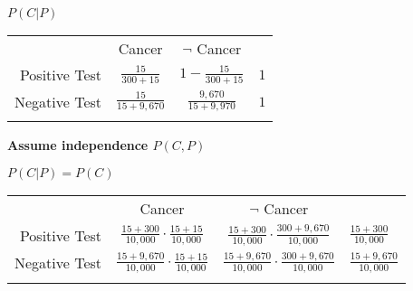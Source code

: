 \textbf{$P(C|P)$}
\begin{tabular}{ r|c|c|l }
\multicolumn{1}{r}{}
      &  \multicolumn{1}{c}{Cancer}
               &  \multicolumn{1}{c}{$\neg$ Cancer} \\
               \cline{2-3}
Positive Test  & $\frac{15}{300 + 15}$   & $1 - \frac{15}{300+15}$  & $1$\\ 
               \cline{2-3}
Negative Test  & $\frac{15}{15 + 9,670}$ & $\frac{9,670}{15+9,970}$ & $1$\\
               \cline{2-3}
\multicolumn{1}{r}{} 
      & \multicolumn{1}{c}{} 
              & \multicolumn{1}{c}{} 
                      & \multicolumn{1}{c}{}\\
\end{tabular}

\textbf{Assume independence $P(C, P)$}

$P(C|P) = P(C)$

\begin{tabular}{ r|c|c|l }
\multicolumn{1}{r}{}
      &  \multicolumn{1}{c}{Cancer}
               &  \multicolumn{1}{c}{$\neg$ Cancer} \\
               \cline{2-3}
Positive Test  & $\frac{15+300}{10,000}\cdot\frac{15+15}{10,000}$   & $\frac{15+300}{10,000}\cdot\frac{300+9,670}{10,000}$  & $\frac{15+300}{10,000}$\\ 
               \cline{2-3}
Negative Test  & $\frac{15+9,670}{10,000}\cdot\frac{15+15}{10,000}$ & $\frac{15+9,670}{10,000}\cdot\frac{300+9,670}{10,000}$ & $\frac{15+9,670}{10,000}$\\
               \cline{2-3}
\multicolumn{1}{r}{} 
      & \multicolumn{1}{c}{} 
              & \multicolumn{1}{c}{} 
                      & \multicolumn{1}{c}{}\\
\end{tabular}


